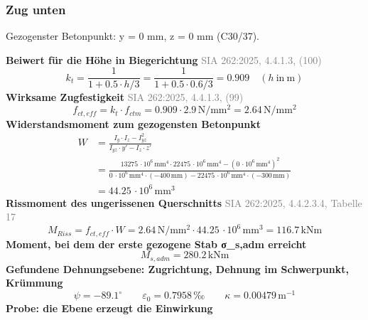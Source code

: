 \documentclass[11pt,a4paper]{article}
\newcommand{\normref}[1]{{\small\textcolor{gray}{#1}}}
\begin{document}
\subsubsection{Zug unten}
Gezogenster Betonpunkt: y = 0 mm, z = 0 mm (C30/37).

\noindent\textbf{Beiwert für die Höhe in Biegerichtung} \hfill \normref{SIA 262:2025, 4.4.1.3, (100)}
\begin{equation*}
k_t = \frac{1}{1 + 0.5 \cdot h/3} = \frac{1}{1 + 0.5 \cdot 0.6/3} = 0.909 \quad \left(h\ \text{in}\ \mathrm{m}\right)
\end{equation*}
\noindent\textbf{Wirksame Zugfestigkeit} \hfill \normref{SIA 262:2025, 4.4.1.3, (99)}
\begin{equation*}
f_{ct,eff} = k_t \cdot f_{ctm} = 0.909 \cdot 2.9\,\mathrm{N}/\mathrm{mm}^{2} = 2.64\,\mathrm{N}/\mathrm{mm}^{2}
\end{equation*}
\noindent\textbf{Widerstandsmoment zum gezogensten Betonpunkt}
\begin{equation*}
\begin{aligned}
  W &= \frac{I_y \cdot I_z - I_{yz}^{2}}{I_{yz} \cdot y' - I_z \cdot z'} \\
  &= \frac{13275\,\cdot 10^{6}\,\mathrm{mm}^{4} \cdot 22475\,\cdot 10^{6}\,\mathrm{mm}^{4} - \left(0\,\cdot 10^{6}\,\mathrm{mm}^{4}\right)^{2}}{0\,\cdot 10^{6}\,\mathrm{mm}^{4} \cdot \left(-400\,\mathrm{mm}\right) - 22475\,\cdot 10^{6}\,\mathrm{mm}^{4} \cdot \left(-300\,\mathrm{mm}\right)} \\
  &= 44.25\,\cdot 10^{6}\,\mathrm{mm}^{3}
\end{aligned}
\end{equation*}
\noindent\textbf{Rissmoment des ungerissenen Querschnitts} \hfill \normref{SIA 262:2025, 4.4.2.3.4, Tabelle 17}
\begin{equation*}
M_{Riss} = f_{ct,eff} \cdot W = 2.64\,\mathrm{N}/\mathrm{mm}^{2} \cdot 44.25\,\cdot 10^{6}\,\mathrm{mm}^{3} = 116.7\,\mathrm{kNm}
\end{equation*}
\noindent\textbf{Moment, bei dem der erste gezogene Stab σ\_s,adm erreicht}
\begin{equation*}
M_{s,adm} = 280.2\,\mathrm{kNm}
\end{equation*}
\noindent\textbf{Gefundene Dehnungsebene: Zugrichtung, Dehnung im Schwerpunkt, Krümmung}
\begin{equation*}
\psi = -89.1^\circ \qquad \varepsilon_0 = 0.7958\,\text{‰} \qquad \kappa = 0.00479\,\mathrm{m}^{-1}
\end{equation*}
\noindent\textbf{Probe: die Ebene erzeugt die Einwirkung}
\end{document}
